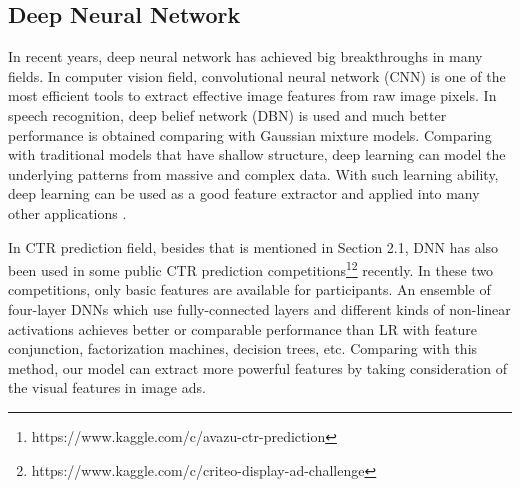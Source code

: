 \documentclass{sig-alternate-05-2015}
\begin{document}
\subsection{Deep Neural Network} 
In recent years, deep neural network has achieved big breakthroughs in many fields. In computer vision field, convolutional neural network (CNN) \cite{NIPS2012_4824} is one of the most efficient tools to extract effective image features from raw image pixels.  In speech recognition, deep belief network (DBN) \cite{hinton2012deep} is used and much better performance is obtained comparing with Gaussian mixture models. Comparing with traditional models that have shallow structure, deep learning can model the underlying patterns  from massive and complex data. With such learning ability, deep learning can be used as a good feature extractor and applied into many other applications \cite{ren2015faster,simonyan2014two}.

In CTR prediction field, besides \cite{zhang2016deep} that is mentioned in Section 2.1, DNN has also been used in some public CTR prediction  competitions\footnote{https://www.kaggle.com/c/avazu-ctr-prediction}\footnote{https://www.kaggle.com/c/criteo-display-ad-challenge} recently. In these two competitions, only basic features are available for participants. An ensemble of four-layer DNNs which use fully-connected layers and different kinds of non-linear activations  achieves better or comparable performance than LR with feature conjunction, factorization machines, decision trees, etc. Comparing with this method, our model can extract more powerful features by taking consideration  of the visual features in image ads. 
\end{document}
